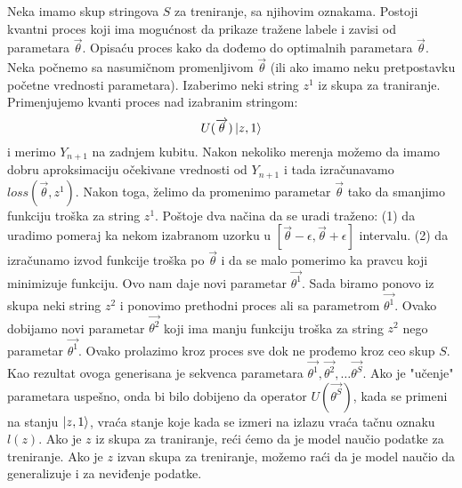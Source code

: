 \documentclass[12pt, letterpaper, oneside]{article}
\begin{document}
Neka imamo skup stringova \(S\) za treniranje, sa njihovim oznakama. Postoji kvantni proces koji ima mogućnost da
prikaze tražene labele i zavisi od parametara $\overrightarrow{\theta}$. Opisaću proces kako da dođemo do optimalnih parametara $\overrightarrow{\theta}$.
Neka počnemo sa nasumičnom promenljivom $\overrightarrow{\theta}$ (ili ako imamo neku pretpostavku početne vrednosti parametara). Izaberimo neki string $z^1$ iz skupa za traniranje.
Primenjujemo kvanti proces nad izabranim stringom:
\[
    U(\overrightarrow{\theta})\Ket{z,1}
\] 
i merimo $Y_{n+1}$ na zadnjem kubitu. Nakon nekoliko merenja možemo da imamo dobru aproksimaciju očekivane vrednosti od $Y_{n+1}$
i tada izračunavamo $\mathit{loss}(\overrightarrow{\theta},z^1)$. Nakon toga, želimo da promenimo parametar $\overrightarrow{\theta}$ tako da smanjimo
funkciju troška za string $z^1$. Poštoje dva načina da se uradi traženo: (1) da uradimo pomeraj ka nekom izabranom uzorku u $[\overrightarrow{\theta}-\epsilon,\overrightarrow{\theta}+\epsilon]$ intervalu.
(2) da izračunamo izvod funkcije troška po $\overrightarrow{\theta}$ i da se malo pomerimo ka pravcu koji minimizuje funkciju.
Ovo nam daje novi parametar $\overrightarrow{\theta^1}$. Sada biramo ponovo iz skupa neki string $z^2$ i ponovimo prethodni proces ali sa parametrom $\overrightarrow{\theta^1}$.
Ovako dobijamo novi parametar $\overrightarrow{\theta^2}$ koji ima manju funkciju troška za string $z^2$ nego parametar $\overrightarrow{\theta^1}$.
Ovako prolazimo kroz proces sve dok ne prođemo kroz ceo skup $S$. Kao rezultat ovoga generisana je sekvenca parametara $\overrightarrow{\theta^1}, \overrightarrow{\theta^2}, \dots \overrightarrow{\theta^S}$.
Ako je "učenje" parametara uspešno, onda bi bilo dobijeno da operator $U(\overrightarrow{\theta^S})$, kada se primeni na stanju $\Ket{z,1}$, vraća stanje koje kada se izmeri na izlazu vraća tačnu oznaku $l(z)$.
Ako je $z$ iz skupa za traniranje, reći ćemo da je model naučio podatke za treniranje. Ako je $z$ izvan skupa za treniranje, možemo raći da je model naučio da generalizuje i za neviđenje podatke.
\end{document}
